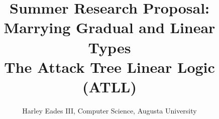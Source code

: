 \usepackage{amsmath,amssymb,amsthm}

\usepackage{fullpage}
\usepackage{hyperref}
\usepackage{color}
\usepackage[barr]{xy}
\usepackage{todonotes}
\usepackage{tikz}
\usepackage{tikz-qtree}
\usepackage{stmaryrd}
\usepackage{mathpartir}
\usepackage{layout}
\usepackage[margin=1.1in]{geometry}


\newtheorem{thm}{Theorem}
\newtheorem{lemma}[thm]{Lemma}
\newtheorem{corollary}[thm]{Corollary}
\newtheorem{definition}[thm]{Definition}
\newtheorem{remark}[thm]{Remark}
\newtheorem{proposition}[thm]{Proposition}
\newtheorem{notn}[thm]{Notation}
\newtheorem{observation}[thm]{Observation}

\newcommand{\cat}[1]{\mathbb{#1}}
\newcommand{\catobj}[1]{\mathsf{Obj}(\cat{#1})}
\newcommand{\catop}[1]{\mathbb{#1}^{\mathsf{op}}}
\newcommand{\sets}[0]{\mathsf{Sets}}
\newcommand{\homs}[2]{\mathsf{Hom}[#1,#2]}
\newcommand{\cur}[0]{\mathsf{cur}}
\newcommand{\curi}[0]{\mathsf{cur}^{-1}}
\newcommand{\app}[0]{\mathsf{app}}
\newcommand{\id}[0]{\mathsf{id}}
\newcommand{\injl}[0]{\mathsf{inj_l}}
\newcommand{\injr}[0]{\mathsf{inj_r}}
\newcommand{\pow}[1]{\mathcal{P}(#1)}
\newcommand{\cpy}[0]{\textcopyright}
\newcommand{\lett}[3]{\mathsf{let}\,#1 = #2\,\mathsf{in}\,#3}



\title{\vspace{-50px}Summer Research Proposal: \\ Marrying Gradual and Linear Types \\ The Attack Tree Linear Logic (ATLL)}
\author{Harley Eades III, Computer Science, Augusta University}
\date{\vspace{-22px}}

\maketitle  

